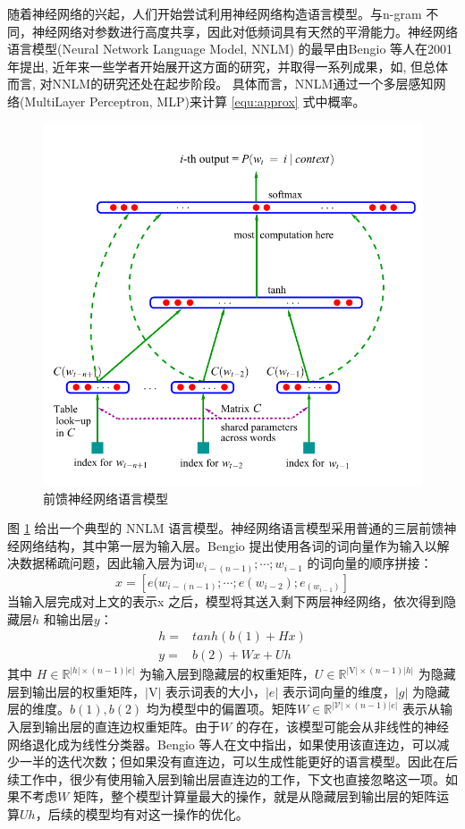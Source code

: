 \documentclass[12pt,a4paper]{article}
\begin{document}
随着神经网络的兴起，人们开始尝试利用神经网络构造语言模型。与n-gram 不同，神经网络对参数进行高度共享，因此对低频词具有天然的平滑能力。神经网络语言模型(Neural Network Language Model, NNLM) 的最早由Bengio 等人在2001年提出\cite{DBLP:conf/nips/BengioDV00}, 近年来一些学者开始展开这方面的研究，并取得一系列成果，如\cite{DBLP:conf/acl/BaroniDK14,DBLP:journals/sigkdd/BellK07,DBLP:journals/pami/BengioCV13,DBLP:journals/tnn/BengioSF94}, 但总体而言, 对NNLM的研究还处在起步阶段。
具体而言，NNLM通过一个多层感知网络(MultiLayer Perceptron, MLP)来计算 \ref{equ:approx} 式中概率。
\begin{figure}
  \centering
  \includegraphics[width=0.7\linewidth]{./figures/nplm.png}
  \caption{前馈神经网络语言模型}\label{fig:nplm}
\end{figure}
图 \ref{fig:nplm} 给出一个典型的 NNLM 语言模型。神经网络语言模型采用普通的三层前馈神经网络结构，其中第一层为输入层。Bengio 提出使用各词的词向量作为输入以解决数据稀疏问题，因此输入层为词$w_{i-(n-1)}; \cdots;w_{i-1} $ 的词向量的顺序拼接：
\begin{equation}\label{equ:we}
  x = [e(w_{i-(n-1)}; \cdots ; e(w_{i-2}); e_{(w_{i-1})}]
\end{equation}
当输入层完成对上文的表示x 之后，模型将其送入剩下两层神经网络，依次得到隐藏层$h$ 和输出层$y$：
\begin{equation}\label{equ:all_nplm}
\begin{split}
h =& tanh(b(1) + Hx) \\
y =& b(2) +Wx + Uh
\end{split}
\end{equation}
其中 $H \in \mathbb{R}^{|h| \times (n-1)|e|}$ 为输入层到隐藏层的权重矩阵，$U \in \mathbb{R}^{|\mathrm{V}|\times (n-1)|h|}$ 为隐藏层到输出层的权重矩阵，$ |\mathrm{V}|$ 表示词表的大小，$|e|$ 表示词向量的维度，$|g|$ 为隐藏层的维度。$b(1),b(2)$ 均为模型中的偏置项。矩阵$W \in \mathbb{R}^{|\mathcal{V}|\times (n-1)|e|}$ 表示从输入层到输出层的直连边权重矩阵。由于$W$ 的存在，该模型可能会从非线性的神经网络退化成为线性分类器。Bengio 等人在文中指出，如果使用该直连边，可以减少一半的迭代次数；但如果没有直连边，可以生成性能更好的语言模型。因此在后续工作中，很少有使用输入层到输出层直连边的工作，下文也直接忽略这一项。如果不考虑$W$ 矩阵，整个模型计算量最大的操作，就是从隐藏层到输出层的矩阵运算$Uh$，后续的模型均有对这一操作的优化。
\end{document}
